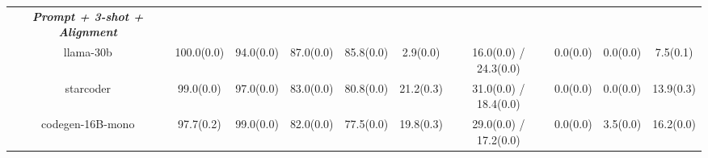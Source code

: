\begin{table}[]
\begin{adjustbox}{max width=\textwidth}
\begin{tabular}{@{}cccccccccc@{}}
\cmidrule(lr){1-10}
\textit{\textbf{Prompt + 3-shot + Alignment}} & \multicolumn{1}{l}{} & \multicolumn{1}{l}{} & \multicolumn{1}{l}{} & \multicolumn{1}{l}{} & \multicolumn{1}{l}{} & \multicolumn{1}{l}{}  & \multicolumn{1}{l}{} & \multicolumn{1}{l}{} & \multicolumn{1}{l}{} \\
llama-30b                                     & 100.0(0.0)           & 94.0(0.0)            & 87.0(0.0)            & 85.8(0.0)            & 2.9(0.0)             & 16.0(0.0) / 24.3(0.0) & 0.0(0.0)             & 0.0(0.0)             & 7.5(0.1)             \\
starcoder                                     & 99.0(0.0)            & 97.0(0.0)            & 83.0(0.0)            & 80.8(0.0)            & 21.2(0.3)            & 31.0(0.0) / 18.4(0.0) & 0.0(0.0)             & 0.0(0.0)             & 13.9(0.3)            \\
codegen-16B-mono                              & 97.7(0.2)            & 99.0(0.0)            & 82.0(0.0)            & 77.5(0.0)            & 19.8(0.3)            & 29.0(0.0) / 17.2(0.0) & 0.0(0.0)             & 3.5(0.0)             & 16.2(0.0)                    \\
\bottomrule
\end{tabular}
\end{adjustbox}
\end{table}



